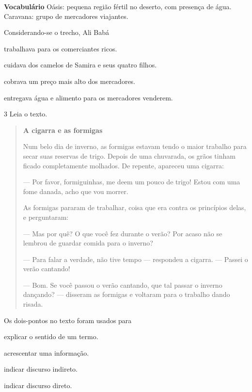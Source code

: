 \textbf{Vocabulário}
Oásis: pequena região fértil no deserto, com presença de água.
Caravana: grupo de mercadores viajantes.

Considerando-se o trecho, Ali Babá

\begin{escolha}
\item trabalhava para os comerciantes ricos.

\item cuidava dos camelos de Samira e seus quatro filhos.

\item cobrava um preço mais alto dos mercadores.

\item entregava água e alimento para os mercadores venderem.
\end{escolha}



\num{3} Leia o texto.

\begin{quote}
\textbf{A cigarra e as formigas}

Num belo dia de inverno, as formigas estavam tendo o maior
trabalho para secar suas reservas de trigo. Depois de uma
chuvarada, os grãos tinham ficado completamente molhados. De
repente, apareceu uma cigarra:

--- Por favor, formiguinhas, me deem um pouco de
trigo! Estou com uma fome danada, acho que vou morrer.

As formigas pararam de trabalhar, coisa que era contra
os princípios delas, e perguntaram:

--- Mas por quê? O que você fez durante o verão? Por
acaso não se lembrou de guardar comida para o inverno?

--- Para falar a verdade, não tive tempo --- respondeu
a cigarra. --- Passei o verão cantando!

--- Bom. Se você passou o verão cantando, que tal
passar o inverno dançando? --- disseram as formigas e
voltaram para o trabalho dando risada.

\end{quote}

Os dois-pontos no texto foram usados para

\begin{escolha}
\item explicar o sentido de um termo.

\item acrescentar uma informação.

\item indicar discurso indireto.

\item indicar discurso direto.
\end{escolha}




